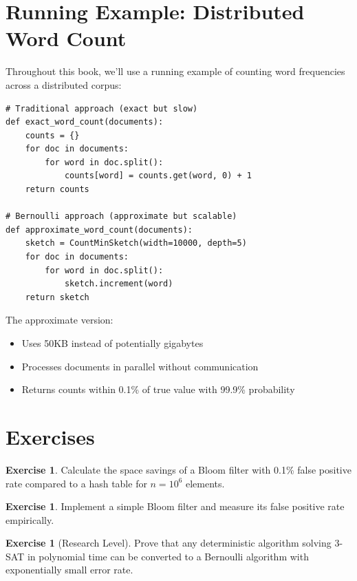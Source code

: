 \documentclass[11pt,twoside,openright]{book}
\theoremstyle{definition}
\newtheorem{exercise}[definition]{Exercise}
\theoremstyle{plain}
\theoremstyle{remark}
\begin{document}
\section{Running Example: Distributed Word Count}

Throughout this book, we'll use a running example of counting word frequencies across a distributed corpus:

\begin{verbatim}
# Traditional approach (exact but slow)
def exact_word_count(documents):
    counts = {}
    for doc in documents:
        for word in doc.split():
            counts[word] = counts.get(word, 0) + 1
    return counts

# Bernoulli approach (approximate but scalable)
def approximate_word_count(documents):
    sketch = CountMinSketch(width=10000, depth=5)
    for doc in documents:
        for word in doc.split():
            sketch.increment(word)
    return sketch
\end{verbatim}

The approximate version:
\begin{itemize}
    \item Uses 50KB instead of potentially gigabytes
    \item Processes documents in parallel without communication
    \item Returns counts within 0.1\% of true value with 99.9\% probability
\end{itemize}

\section{Exercises}

\begin{exercise}
Calculate the space savings of a Bloom filter with 0.1\% false positive rate compared to a hash table for $n = 10^6$ elements.
\end{exercise}

\begin{exercise}
Implement a simple Bloom filter and measure its false positive rate empirically.
\end{exercise}

\begin{exercise}[Research Level]
Prove that any deterministic algorithm solving 3-SAT in polynomial time can be converted to a Bernoulli algorithm with exponentially small error rate.
\end{exercise}
\end{document}
